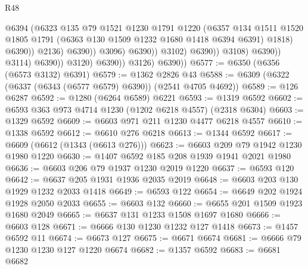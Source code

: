 \begin{lexlean}{R48}
\begin{coremodule}
                                                @6394
                                                (@6323
                                                  @135
                                                  @79
                                                  @1521
                                                  @1230
                                                  @1791
                                                  @1220
                                                  (@6357
                                                    @134
                                                    @1511
                                                    @1520
                                                    @1805
                                                    @1791
                                                    (@6363 @130 @1509 @1232 @1680 @1418 @6394 @6391)
                                                    @1818)
                                                  @6390))
                                              @2136)
                                            @6390))
                                        @3096)
                                      @6390))
                                  @3102)
                                @6390))
                            @3108)
                          @6390))
                      @3114)
                    @6390))
                @3120)
              @6390))
          @3126)
        @6390))
@6577 := @6350 (@6356 (@6573 @3132) @6391)
@6579 := @1362 @2826 @43
@6588 := @6309 (@6322 (@6337 (@6343 (@6577 @6579) @6390)) (@2541 @4705 @4692))
@6589 := @126 @6287
@6592 := @1280 (@6264 @6589) @6221
@6593 := @1319 @6592
@6602 := @6593 @363 @973 @4714 @1230 (@1202 @6218 @4557) (@2318 @6304)
@6603 := @1329 @6592
@6609 := @6603 @971 @211 @1230 @4477 @6218 @4557
@6610 := @1338 @6592
@6612 := @6610 @276 @6218
@6613 := @1344 @6592
@6617 := @6609 (@6612 (@1343 (@6613 @276)))
@6623 := @6603 @209 @79 @1942 @1230 @1980 @1220
@6630 := @1407 @6592 @185 @208 @1939 @1941 @2021 @1980
@6636 := @6603 @206 @79 @1937 @1230 @2019 @1220
@6637 := @6593 @120
@6642 := @6637 @205 @1931 @1936 @2035 @2019
@6648 := @6603 @203 @130 @1929 @1232 @2033 @1418
@6649 := @6593 @122
@6654 := @6649 @202 @1924 @1928 @2050 @2033
@6655 := @6603 @132
@6660 := @6655 @201 @1509 @1923 @1680 @2049
@6665 := @6637 @131 @1233 @1508 @1697 @1680
@6666 := @6603 @128
@6671 := @6666 @130 @1230 @1232 @127 @1418
@6673 := @1457 @6592 @11
@6674 := @6673 @127
@6675 := @6671 @6674
@6681 := @6666 @79 @1230 @1230 @127 @1220 @6674
@6682 := @1357 @6592
@6683 := @6681 @6682

\end{coremodule}
\end{lexlean}
